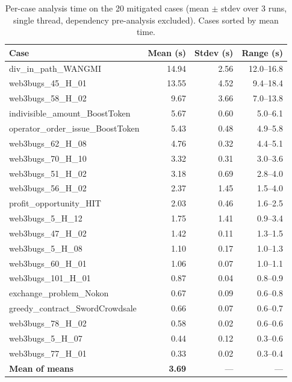 \documentclass[pdflatex,sn-basic]{sn-jnl}%
\theoremstyle{thmstyleone}%
\theoremstyle{thmstyletwo}%
\theoremstyle{thmstylethree}%
\begin{document}
\begin{table}[t]
\centering
\caption{Per-case analysis time on the 20 mitigated cases (mean $\pm$ stdev over 3 runs, single thread, dependency pre-analysis excluded). Cases sorted by mean time.}
\label{tab:rq1-timing}
\small
\begin{tabular*}{\linewidth}{@{\extracolsep{\fill}} l r r r @{}}
\toprule
\textbf{Case} & \textbf{Mean (s)} & \textbf{Stdev (s)} & \textbf{Range (s)} \\
\midrule
div\_in\_path\_WANGMI             & 14.94 & 2.56 & 12.0--16.8 \\
web3bugs\_45\_H\_01               & 13.55 & 4.52 & 9.4--18.4  \\
web3bugs\_58\_H\_02               &  9.67 & 3.66 & 7.0--13.8  \\
indivisible\_amount\_BoostToken   &  5.67 & 0.60 & 5.0--6.1   \\
operator\_order\_issue\_BoostToken&  5.43 & 0.48 & 4.9--5.8   \\
web3bugs\_62\_H\_08               &  4.76 & 0.32 & 4.4--5.1   \\
web3bugs\_70\_H\_10               &  3.32 & 0.31 & 3.0--3.6   \\
web3bugs\_51\_H\_02               &  3.18 & 0.69 & 2.8--4.0   \\
web3bugs\_56\_H\_02               &  2.37 & 1.45 & 1.5--4.0   \\
profit\_opportunity\_HIT          &  2.03 & 0.46 & 1.6--2.5   \\
web3bugs\_5\_H\_12                &  1.75 & 1.41 & 0.9--3.4   \\
web3bugs\_47\_H\_02               &  1.42 & 0.11 & 1.3--1.5   \\
web3bugs\_5\_H\_08                &  1.10 & 0.17 & 1.0--1.3   \\
web3bugs\_60\_H\_01               &  1.06 & 0.07 & 1.0--1.1   \\
web3bugs\_101\_H\_01              &  0.87 & 0.04 & 0.8--0.9   \\
exchange\_problem\_Nokon          &  0.67 & 0.09 & 0.6--0.8   \\
greedy\_contract\_SwordCrowdsale  &  0.66 & 0.07 & 0.6--0.7   \\
web3bugs\_78\_H\_02               &  0.58 & 0.02 & 0.6--0.6   \\
web3bugs\_5\_H\_07                &  0.44 & 0.12 & 0.3--0.6   \\
web3bugs\_77\_H\_01               &  0.33 & 0.02 & 0.3--0.4   \\
\midrule
\textbf{Mean of means} & \textbf{3.69} & --- & --- \\
\bottomrule
\end{tabular*}
\end{table}
\end{document}
